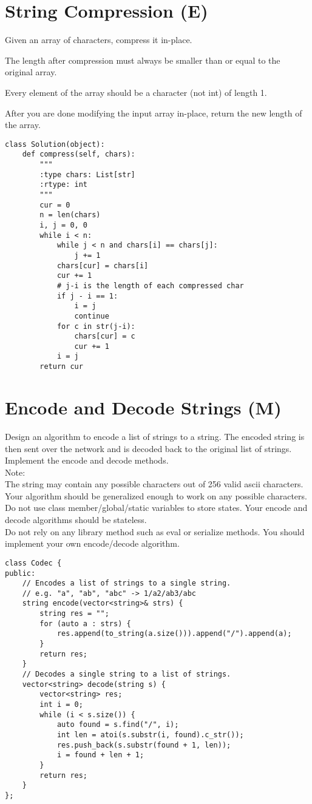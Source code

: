 \section{String Compression (E)}
Given an array of characters, compress it in-place.

The length after compression must always be smaller than or equal to the original array.

Every element of the array should be a character (not int) of length 1.

After you are done modifying the input array in-place, return the new length of the array.

\begin{lstlisting}
class Solution(object):
    def compress(self, chars):
        """
        :type chars: List[str]
        :rtype: int
        """
        cur = 0
        n = len(chars)
        i, j = 0, 0
        while i < n:
            while j < n and chars[i] == chars[j]:
                j += 1
            chars[cur] = chars[i]
            cur += 1
            # j-i is the length of each compressed char
            if j - i == 1: 
                i = j
                continue
            for c in str(j-i):
                chars[cur] = c
                cur += 1
            i = j
        return cur
\end{lstlisting}

\section{Encode and Decode Strings (M)}
Design an algorithm to encode a list of strings to a string. The encoded string is then sent over the network and is decoded back to the original list of strings. Implement the encode and decode methods.\\

Note:\\
    The string may contain any possible characters out of 256 valid ascii characters. Your algorithm should be generalized enough to work on any possible characters.\\
    Do not use class member/global/static variables to store states. Your encode and decode algorithms should be stateless.\\
    Do not rely on any library method such as eval or serialize methods. You should implement your own encode/decode algorithm.\\

\begin{lstlisting}
class Codec {
public:
    // Encodes a list of strings to a single string.
    // e.g. "a", "ab", "abc" -> 1/a2/ab3/abc
    string encode(vector<string>& strs) {
        string res = "";
        for (auto a : strs) {
            res.append(to_string(a.size())).append("/").append(a);
        }
        return res;
    }
    // Decodes a single string to a list of strings.
    vector<string> decode(string s) {
        vector<string> res;
        int i = 0;
        while (i < s.size()) {
            auto found = s.find("/", i);
            int len = atoi(s.substr(i, found).c_str());
            res.push_back(s.substr(found + 1, len));
            i = found + len + 1;
        }
        return res;
    }
};
\end{lstlisting}


